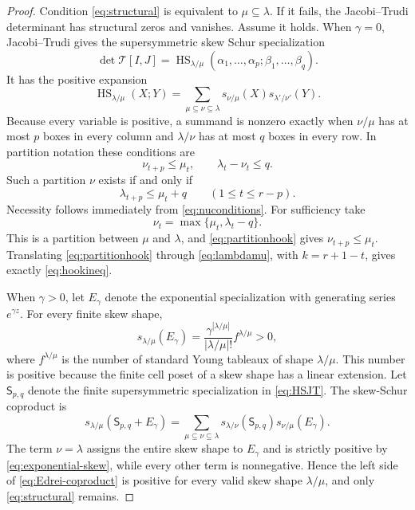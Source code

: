 \documentclass{amsart}
\numberwithin{equation}{section}
\theoremstyle{definition}
\theoremstyle{remark}
\newcommand{\HS}{\operatorname{HS}}
\begin{document}
\begin{proof}
Condition \eqref{eq:structural} is equivalent to $\mu\subseteq\lambda$.  If it fails, the Jacobi--Trudi determinant has structural zeros and vanishes.  Assume it holds.  When $\gamma=0$, Jacobi--Trudi gives the supersymmetric skew Schur specialization
\begin{equation}\label{eq:HSJT}
 \det\mathcal T[I,J]
 =\HS_{\lambda/\mu}(\alpha_1,\ldots,\alpha_p;
                         \beta_1,\ldots,\beta_q).
\end{equation}
It has the positive expansion
\begin{equation}\label{eq:HSexpansion}
 \HS_{\lambda/\mu}(X;Y)
 =\sum_{\mu\subseteq\nu\subseteq\lambda}
   s_{\nu/\mu}(X)s_{\lambda'/\nu'}(Y).
\end{equation}
Because every variable is positive, a summand is nonzero exactly when $\nu/\mu$ has at most $p$ boxes in every column and $\lambda/\nu$ has at most $q$ boxes in every row.  In partition notation these conditions are
\begin{equation}\label{eq:nuconditions}
 \nu_{t+p}\le\mu_t,
 \qquad
 \lambda_t-\nu_t\le q.
\end{equation}
Such a partition $\nu$ exists if and only if
\begin{equation}\label{eq:partitionhook}
 \lambda_{t+p}\le\mu_t+q
 \qquad(1\le t\le r-p).
\end{equation}
Necessity follows immediately from \eqref{eq:nuconditions}.  For sufficiency take
\begin{equation}\label{eq:nuchoice}
 \nu_t=\max\{\mu_t,\lambda_t-q\}.
\end{equation}
This is a partition between $\mu$ and $\lambda$, and \eqref{eq:partitionhook} gives $\nu_{t+p}\le\mu_t$.  Translating \eqref{eq:partitionhook} through \eqref{eq:lambdamu}, with $k=r+1-t$, gives exactly \eqref{eq:hookineq}.

When $\gamma>0$, let $E_\gamma$ denote the exponential specialization with generating series $e^{\gamma z}$.  For every finite skew shape,
\begin{equation}\label{eq:exponential-skew}
 s_{\lambda/\mu}(E_\gamma)
 =\frac{\gamma^{|\lambda/\mu|}}{|\lambda/\mu|!}
 f^{\lambda/\mu}>0,
\end{equation}
where $f^{\lambda/\mu}$ is the number of standard Young tableaux of shape $\lambda/\mu$.  This number is positive because the finite cell poset of a skew shape has a linear extension.  Let $\mathsf S_{p,q}$ denote the finite supersymmetric specialization in \eqref{eq:HSJT}.  The skew-Schur coproduct is
\begin{equation}\label{eq:Edrei-coproduct}
 s_{\lambda/\mu}(\mathsf S_{p,q}+E_\gamma)
 =\sum_{\mu\subseteq\nu\subseteq\lambda}
   s_{\lambda/\nu}(\mathsf S_{p,q})
   s_{\nu/\mu}(E_\gamma).
\end{equation}
The term $\nu=\lambda$ assigns the entire skew shape to $E_\gamma$ and is strictly positive by \eqref{eq:exponential-skew}, while every other term is nonnegative.  Hence the left side of \eqref{eq:Edrei-coproduct} is positive for every valid skew shape $\lambda/\mu$, and only \eqref{eq:structural} remains.
\end{proof}
\end{document}
